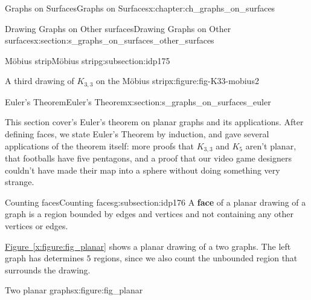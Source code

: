 \documentclass[oneside,10pt,]{book}
\newcommand{\xreffont}{\relax}
\newcommand{\terminology}[1]{\textbf{#1}}
\numberwithin{equation}{section}
\begin{document}
\begin{chapterptx}{Graphs on Surfaces}{}{Graphs on Surfaces}{}{}{x:chapter:ch_graphs_on_surfaces}
\begin{sectionptx}{Drawing Graphs on Other surfaces}{}{Drawing Graphs on Other surfaces}{}{}{x:section:s_graphs_on_surfaces_other_surfaces}
\begin{subsectionptx}{Möbius strip}{}{Möbius strip}{}{}{g:subsection:idp175}
\begin{figureptx}{A third drawing of \(K_{3,3}\) on the Möbius strip}{x:figure:fig-K33-mobius2}{}
\begin{image}{0}{1}{0}
{
}%
\end{image}%
\tcblower
\end{figureptx}%
\end{subsectionptx}
\end{sectionptx}
%
%
\typeout{************************************************}
\typeout{************************************************}
%
\begin{sectionptx}{Euler's Theorem}{}{Euler's Theorem}{}{}{x:section:s_graphs_on_surfaces_euler}
\begin{introduction}{}%
This section cover's Euler's theorem on planar graphs and its applications. After defining faces, we state Euler's Theorem by induction, and gave several applications of the theorem itself: more proofs that \(K_{3,3}\) and \(K_5\) aren't planar, that footballs have five pentagons, and a proof that our video game designers couldn't have made their map into a sphere without doing something very strange.%
\end{introduction}%
%
%
\typeout{************************************************}
\typeout{************************************************}
%
\begin{subsectionptx}{Counting faces}{}{Counting faces}{}{}{g:subsection:idp176}
A \terminology{face} of a planar drawing of a graph is a region bounded by edges and vertices and not containing any other vertices or edges.%
\par
\hyperref[x:figure:fig_planar]{Figure~{\xreffont\ref{x:figure:fig_planar}}} shows a planar drawing of a two graphs. The left graph has determines \(5\) regions, since we also count the unbounded region that surrounds the drawing.%
\begin{figureptx}{Two planar graphs}{x:figure:fig_planar}{}%
\begin{image}{0}{1}{0}%
\resizebox{\linewidth}{!}{%
\begin{tikzpicture}



\end{tikzpicture}}
\end{image}
\end{figureptx}
\end{subsectionptx}
\end{sectionptx}
\end{chapterptx}
\end{document}
